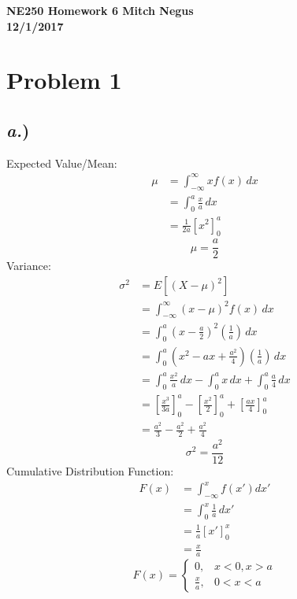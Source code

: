 \documentclass{article}
\begin{document}
\thispagestyle{empty}

{\bf {\large {NE250 Homework {6} \hfill Mitch Negus\\
		\hspace*{\fill} 12/1/2017\\ }}}
		
		
		

\section*{Problem 1}

\subsection*{\textit{a.})}
Expected Value/Mean: 
\begin{align*}
\mu &= \int_{-\infty}^{\infty} x f(x) \, dx \\
	&= \int_0^a \frac{x}{a} \, dx  \\
	&= \frac{1}{2a}\left[x^2\right]_0^a
\end{align*}
$$\boxed{ \mu = \frac{a}{2} }$$
Variance:
\begin{align*}
\sigma^2	&= E[(X-\mu)^2] \\
			&= \int_{-\infty}^{\infty}(x-\mu)^2 f(x) \, dx \\
			&= \int_0^a \left(x-\frac{a}{2}\right)^2 \left(\frac{1}{a}\right) \, dx \\
			&= \int_0^a \left(x^2-ax+\frac{a^2}{4}\right) \left(\frac{1}{a}\right) \, dx \\
			&= \int_0^a \frac{x^2}{a} \, dx - \int_0^a x \, dx + \int_0^a \frac{a}{4} \, dx \\
			&= \left[ \frac{x^3}{3a} \right]_0^a - \left[ \frac{x^2}{2} \right]_0^a + \left[ \frac{ax}{4} \right]_0^a \\
			&= \frac{a^2}{3} - \frac{a^2}{2} + \frac{a^2}{4}
\end{align*}
$$\boxed{ \sigma^2 = \frac{a^2}{12} }$$
Cumulative Distribution Function:
\begin{align*}
F(x)	&= \int_{-\infty}^{x} f(x') dx' \\
		&= \int_0^x \frac{1}{a} \, dx' \\
		&= \frac{1}{a}\left[x'\right]_0^x \\
		&= \frac{x}{a}
\end{align*}
$$\boxed{ F(x) = \begin{cases}	0, & x < 0, x > a \\
								\frac{x}{a}, & 0 < x < a \end{cases}}$$
\end{document}
